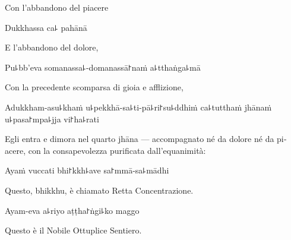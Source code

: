 \begin{english}
  Con l'abbandono del piacere
\end{english}

Dukkhassa ca꜕ pahānā

\begin{english}
  E l'abbandono del dolore,
\end{english}

Pu꜕bb'eva somanassa꜕-domanassā꜓naṁ a꜕tthaṅga꜕mā

\begin{english}
  Con la precedente scomparsa di gioia e afflizione,
\end{english}

Adukkham-asu꜕khaṁ u꜕pekkhā-sa꜕ti-pā꜕ri꜓su꜕ddhiṁ ca꜕tutthaṁ jhānaṁ u꜕pasa꜓mpa꜕jja vi꜓ha꜕rati

\begin{english}
  Egli entra e dimora nel quarto jhāna — accompagnato né da dolore né da piacere, con la consapevolezza purificata dall'equanimità:
\end{english}

Ayaṁ vuccati bhi꜓kkh꜕ave sa꜓mmā-sa꜕mādhi

\begin{english}
  Questo, bhikkhu, è chiamato Retta Concentrazione.
\end{english}

Ayam-eva a꜕riyo aṭṭha꜓ṅgi꜕ko maggo

\begin{english}
  Questo è il Nobile Ottuplice Sentiero.
\end{english}